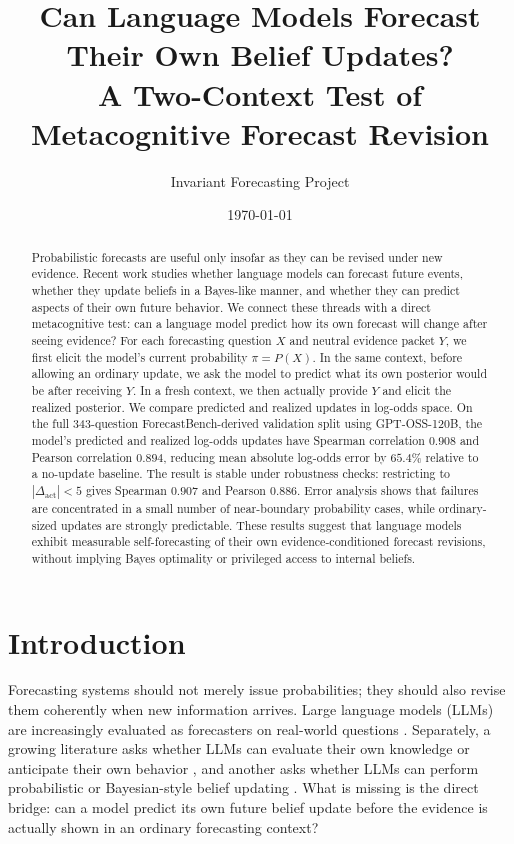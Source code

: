 \documentclass[11pt]{article}
\title{Can Language Models Forecast Their Own Belief Updates?\\
\large A Two-Context Test of Metacognitive Forecast Revision}
\author{Invariant Forecasting Project}
\date{\today}
\newcommand{\act}{\mathrm{act}}
\begin{document}
\maketitle

\begin{abstract}
Probabilistic forecasts are useful only insofar as they can be revised under
new evidence. Recent work studies whether language models can forecast future
events, whether they update beliefs in a Bayes-like manner, and whether they
can predict aspects of their own future behavior. We connect these threads with
a direct metacognitive test: can a language model predict how its own forecast
will change after seeing evidence? For each forecasting question $X$ and
neutral evidence packet $Y$, we first elicit the model's current probability
$\pi=P(X)$. In the same context, before allowing an ordinary update, we ask the
model to predict what its own posterior would be after receiving $Y$. In a
fresh context, we then actually provide $Y$ and elicit the realized posterior.
We compare predicted and realized updates in log-odds space. On the full 343-question
ForecastBench-derived validation split using GPT-OSS-120B, the model's predicted
and realized log-odds updates have Spearman correlation $0.908$ and Pearson
correlation $0.894$, reducing mean absolute log-odds error by $65.4\%$
relative to a no-update baseline. The result is stable under robustness checks:
restricting to $|\Delta_{\act}|<5$ gives Spearman $0.907$ and Pearson $0.886$.
Error analysis shows that failures are concentrated in a small number of
near-boundary probability cases, while ordinary-sized updates are strongly
predictable. These results
suggest that language models exhibit measurable self-forecasting of their own
evidence-conditioned forecast revisions, without implying Bayes optimality or
privileged access to internal beliefs.
\end{abstract}

\section{Introduction}

Forecasting systems should not merely issue probabilities; they should also
revise them coherently when new information arrives. Large language models
(LLMs) are increasingly evaluated as forecasters on real-world questions
\cite{halawi2024forecasting,karger2024forecastbench}. Separately, a growing
literature asks whether LLMs can evaluate their own knowledge or anticipate
their own behavior \cite{kadavath2022know,ashok2025behavior,binder2024inward},
and another asks whether LLMs can perform probabilistic or Bayesian-style
belief updating \cite{qiu2026bayesian}. What is missing is the direct bridge:
can a model predict its own future belief update before the evidence is
actually shown in an ordinary forecasting context?
\end{document}
